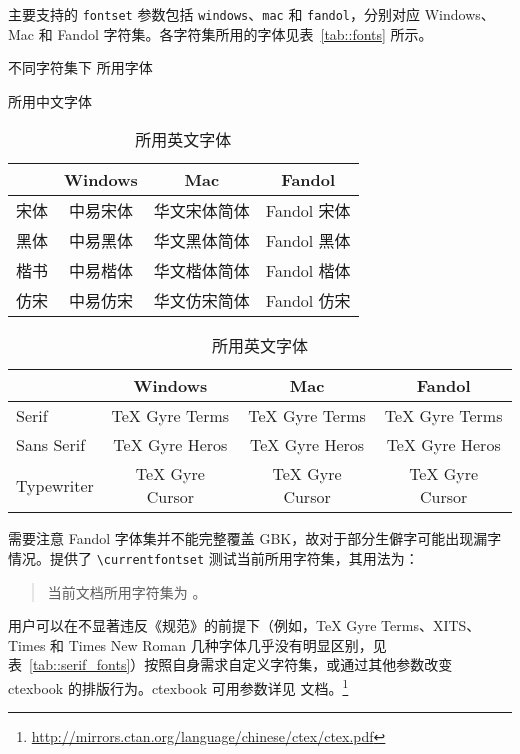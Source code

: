 \documentclass[
  fontset = mac,
]{shtthesis}
\providecommand{\timesnewroman}{\rmfamily}
\providecommand{\timesfamily}{\rmfamily}
\providecommand{\xitsfamily}{\rmfamily}
\begin{document}
\shtthesis 主要支持的 \verb|fontset| 参数包括 \verb|windows|、\verb|mac| 和 \verb|fandol|，分别对应 Windows、Mac 和 Fandol 字符集。各字符集所用的字体见表~\ref{tab::fonts} 所示。

\begin{table}[htb]
  \centering
  \caption{不同字符集下 \shtthesis 所用字体}
  \label{tab::fonts}
  \begin{subtable}{\columnwidth}
    \centering
    \caption{\shtthesis 所用中文字体}
    \label{tab::chs_fonts}
    \begin{tabular}{l *{3}{c}}
      \toprule
       & Windows & Mac & Fandol \\
      \midrule
      宋体 & 中易宋体 & 华文宋体简体 & Fandol 宋体 \\
      黑体 & 中易黑体 & 华文黑体简体 & Fandol 黑体 \\
      楷书 & 中易楷体 & 华文楷体简体 & Fandol 楷体 \\
      仿宋 & 中易仿宋 & 华文仿宋简体 & Fandol 仿宋 \\
      \bottomrule
    \end{tabular}
  \end{subtable}
  \newline
  \vspace{12pt}
  \newline
  \begin{subtable}{\columnwidth}
    \centering
    \caption{\shtthesis 所用英文字体}
    \label{tab::eng_fonts}
    \begin{tabular}{l *{3}{c}}
      \toprule
       & Windows & Mac & Fandol \\
      \midrule
      Serif      & TeX Gyre Terms & TeX Gyre Terms & TeX Gyre Terms \\
      Sans Serif & TeX Gyre Heros & TeX Gyre Heros & TeX Gyre Heros \\
      Typewriter & TeX Gyre Cursor & TeX Gyre Cursor & TeX Gyre Cursor \\
      \bottomrule
    \end{tabular}
  \end{subtable}
\end{table}

需要注意 Fandol 字体集并不能完整覆盖 GBK，故对于部分生僻字可能出现漏字情况。\shtthesis 提供了 \verb|\currentfontset| 测试当前所用字符集，其用法为：
\begin{quotation}
当前文档所用字符集为 \texttt{\currentfontset}。
\end{quotation}
用户可以在不显著违反《规范》的前提下（例如，{\rmfamily TeX Gyre Terms}、{\xitsfamily XITS}、{\timesfamily Times} 和 {\timesnewroman Times New Roman} 几种字体几乎没有明显区别，见表~\ref{tab::serif_fonts}）按照自身需求自定义字符集，或通过其他参数改变 \textsf{ctexbook} 的排版行为。\textsf{ctexbook} 可用参数详见 \CTeX 文档。\footnote{\url{http://mirrors.ctan.org/language/chinese/ctex/ctex.pdf}}
\end{document}
